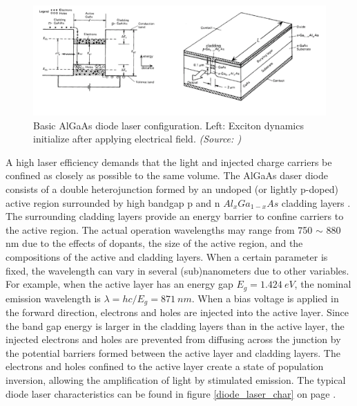 \begin{figure} [ht]
\centering
\includegraphics[scale=0.5]{chapters/img/laser_diode_algaas.png}	
\caption{Basic AlGaAs diode \acs{laser} configuration. Left: Exciton dynamics initialize after applying electrical field. \emph{(Source: \cite{algaasdiodes})}}
\label{algaas_laser_configuration} 
\end{figure}

A high laser efficiency demands that the light and injected charge carriers be confined as closely as possible to the same volume. The AlGaAs daser diode consists of a double heterojunction formed by an undoped (or lightly p-doped) active region surrounded by high bandgap p and n $Al_{x}Ga_{1-x}As$ cladding layers \cite{algaasdiodes}. The surrounding cladding layers provide an energy barrier to confine carriers to the active region. The actual operation wavelengths may range from 750 $\sim$ 880 nm due to the effects of dopants, the size of the active region, and the compositions of the active and cladding layers. When a certain parameter is fixed, the wavelength can vary in several (sub)nanometers due to other variables. For example, when the active layer has an energy gap $E_{g} = 1.424\ eV$, the nominal emission wavelength is $\lambda = hc/E_{g}= 871\ nm$. When a bias voltage is applied in the forward direction, electrons and holes are injected into the active layer. Since the band gap energy is larger in the cladding layers than in the active layer, the injected electrons and holes are prevented from diffusing across the junction by the potential barriers formed between the active layer and cladding layers. The electrons and holes confined to the active layer create a state of population inversion, allowing the amplification of light by stimulated emission. The typical diode laser characteristics can be found in figure \ref{diode_laser_char} on page \pageref{diode_laser_char}.

